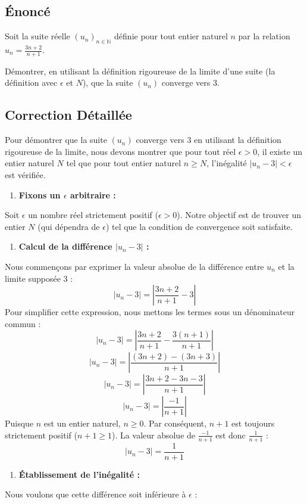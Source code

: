 \documentclass[a4paper,11pt]{report}
\begin{document}
\subsection*{Énoncé}
Soit la suite réelle $(u_n)_{n \in \mathbb{N}}$ définie pour tout entier naturel $n$ par la relation $u_n = \frac{3n+2}{n+1}$.

Démontrer, en utilisant la définition rigoureuse de la limite d'une suite (la définition avec $\epsilon$ et $N$), que la suite $(u_n)$ converge vers 3.

\subsection*{Correction Détaillée}
Pour démontrer que la suite $(u_n)$ converge vers 3 en utilisant la définition rigoureuse de la limite, nous devons montrer que pour tout réel $\epsilon > 0$, il existe un entier naturel $N$ tel que pour tout entier naturel $n \ge N$, l'inégalité $|u_n - 3| < \epsilon$ est vérifiée.
\begin{enumerate}
\item \textbf{Fixons un $\epsilon$ arbitraire :}
\end{enumerate}
    Soit $\epsilon$ un nombre réel strictement positif ($\epsilon > 0$). Notre objectif est de trouver un entier $N$ (qui dépendra de $\epsilon$) tel que la condition de convergence soit satisfaite.
\begin{enumerate}
\item \textbf{Calcul de la différence $|u_n - 3|$ :}
\end{enumerate}
    Nous commençons par exprimer la valeur absolue de la différence entre $u_n$ et la limite supposée 3 :
    $$|u_n - 3| = \left|\frac{3n+2}{n+1} - 3\right|$$
    Pour simplifier cette expression, nous mettons les termes sous un dénominateur commun :
    $$|u_n - 3| = \left|\frac{3n+2}{n+1} - \frac{3(n+1)}{n+1}\right|$$
    $$|u_n - 3| = \left|\frac{(3n+2) - (3n+3)}{n+1}\right|$$
    $$|u_n - 3| = \left|\frac{3n+2-3n-3}{n+1}\right|$$
    $$|u_n - 3| = \left|\frac{-1}{n+1}\right|$$
    Puisque $n$ est un entier naturel, $n \ge 0$. Par conséquent, $n+1$ est toujours strictement positif ($n+1 \ge 1$). La valeur absolue de $\frac{-1}{n+1}$ est donc $\frac{1}{n+1}$ :
    $$|u_n - 3| = \frac{1}{n+1}$$
\begin{enumerate}
\item \textbf{Établissement de l'inégalité :}
\end{enumerate}
    Nous voulons que cette différence soit inférieure à $\epsilon$ :
\end{document}

